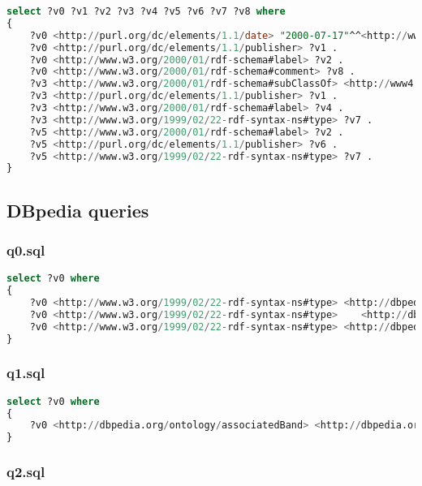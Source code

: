 \documentclass[titlepage, a4paper, 12pt] {article}
\begin{document}
\begin{lstlisting}[language=SQL] 
select ?v0 ?v1 ?v2 ?v3 ?v4 ?v5 ?v6 ?v7 ?v8 where
{
	?v0 <http://purl.org/dc/elements/1.1/date> "2000-07-17"^^<http://www.w3.org/2001/XMLSchema#date> .
	?v0 <http://purl.org/dc/elements/1.1/publisher> ?v1 .
	?v0 <http://www.w3.org/2000/01/rdf-schema#label> ?v2 .
	?v0 <http://www.w3.org/2000/01/rdf-schema#comment> ?v8 .
	?v3 <http://www.w3.org/2000/01/rdf-schema#subClassOf> <http://www4.wiwiss.fu-berlin.de/bizer/bsbm/v01/instances/ProductType2> .
	?v3 <http://purl.org/dc/elements/1.1/publisher> ?v1 .
	?v3 <http://www.w3.org/2000/01/rdf-schema#label> ?v4 .
	?v3 <http://www.w3.org/1999/02/22-rdf-syntax-ns#type> ?v7 .
	?v5 <http://www.w3.org/2000/01/rdf-schema#label> ?v2 .
	?v5 <http://purl.org/dc/elements/1.1/publisher> ?v6 .
	?v5 <http://www.w3.org/1999/02/22-rdf-syntax-ns#type> ?v7 .
}
\end{lstlisting}

\subsection{DBpedia queries}\label{dbpedia}

\subsubsection{q0.sql}

\begin{lstlisting}[language=SQL] 
select ?v0 where
{
	?v0 <http://www.w3.org/1999/02/22-rdf-syntax-ns#type> <http://dbpedia.org/class/yago/LanguagesOfBotswana> .
	?v0 <http://www.w3.org/1999/02/22-rdf-syntax-ns#type>    <http://dbpedia.org/class/yago/LanguagesOfNamibia> .
	?v0 <http://www.w3.org/1999/02/22-rdf-syntax-ns#type> <http://dbpedia.org/ontology/Language> .
}
\end{lstlisting}

\subsubsection{q1.sql}

\begin{lstlisting}[language=SQL] 
select ?v0 where
{
	?v0 <http://dbpedia.org/ontology/associatedBand> <http://dbpedia.org/resource/LCD_Soundsystem> .
}
\end{lstlisting}

\subsubsection{q2.sql}
\end{document}
